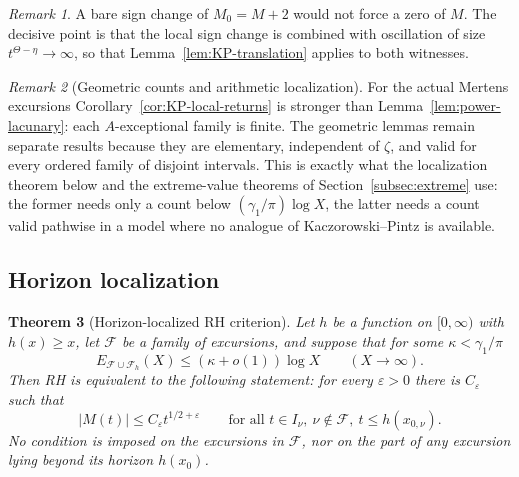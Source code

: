 \documentclass[11pt]{amsart}
\numberwithin{equation}{section}
\theoremstyle{plain}
\newtheorem{theorem}{Theorem}[section]
\theoremstyle{definition}
\theoremstyle{remark}
\newtheorem{remark}[theorem]{Remark}
\newcommand{\eps}{\varepsilon}
\newcommand{\F}{\mathcal{F}}
\begin{document}
\begin{remark}
A bare sign change of $M_0=M+2$ would not force a zero of $M$. The
decisive point is that the local sign change is combined with oscillation of
size $t^{\Theta-\eta}\to\infty$, so that Lemma~\ref{lem:KP-translation}
applies to both witnesses.
\end{remark}

\begin{remark}[Geometric counts and arithmetic localization]
\label{rem:geom-vs-arith}
For the actual Mertens excursions Corollary~\ref{cor:KP-local-returns} is
stronger than Lemma~\ref{lem:power-lacunary}: each $A$-exceptional family is
finite. The geometric lemmas remain separate results because they are
elementary, independent of $\zeta$, and valid for every ordered family of
disjoint intervals. This is exactly what the localization theorem below and
the extreme-value theorems of Section~\ref{subsec:extreme} use: the former
needs only a count below $(\gamma_1/\pi)\log X$, the latter needs a count
valid pathwise in a model where no analogue of Kaczorowski--Pintz is
available.
\end{remark}

\subsection{Horizon localization}
\label{subsec:horizon}

\begin{theorem}[Horizon-localized RH criterion]
\label{thm:horizon}
\label{thm:sparse-RH}
Let $h$ be a function on $[0,\infty)$ with $h(x)\ge x$, let $\F$ be a family
of excursions, and suppose that for some $\kappa<\gamma_1/\pi$
\begin{equation}
\label{eq:horizon-hyp}
E_{\F\cup\F_h}(X)\le(\kappa+o(1))\log X\qquad(X\to\infty).
\end{equation}
Then RH is equivalent to the following statement: for every $\eps>0$ there
is $C_\eps$ such that
\begin{equation}
\label{eq:restricted-RH}
|M(t)|\le C_\eps t^{1/2+\eps}
\qquad\text{for all }t\in I_\nu,\ \nu\notin\F,\ t\le h(x_{0,\nu}).
\end{equation}
No condition is imposed on the excursions in $\F$, nor on the part of any
excursion lying beyond its horizon $h(x_0)$.
\end{theorem}
\end{document}
